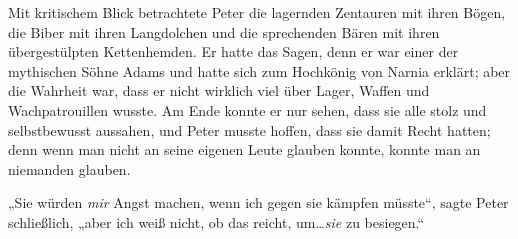 

Mit kritischem Blick betrachtete Peter die lagernden Zentauren mit ihren Bögen, die Biber mit ihren Langdolchen und die sprechenden Bären mit ihren übergestülpten Kettenhemden. Er hatte das Sagen, denn er war einer der mythischen Söhne Adams und hatte sich zum Hochkönig von Narnia erklärt; aber die Wahrheit war, dass er nicht wirklich viel über Lager, Waffen und Wachpatrouillen wusste. Am Ende konnte er nur sehen, dass sie alle stolz und selbstbewusst aussahen, und Peter musste hoffen, dass sie damit Recht hatten; denn wenn man nicht an seine eigenen Leute glauben konnte, konnte man an niemanden glauben.

„Sie würden \emph{mir} Angst machen, wenn ich gegen sie kämpfen müsste“, sagte Peter schließlich, „aber ich weiß nicht, ob das reicht, um…\emph{sie} zu besiegen.“


